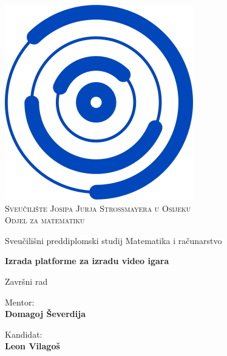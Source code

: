 \documentclass{mathos}
\begin{document}
\renewcommand\bibname{Literatura}
\renewcommand\labelitemi{-}

\begin{titlepage}
    \begin{center}
        \includegraphics[keepaspectratio=true,scale=0.4]{MathosLogo.png} \\ \vspace{1mm}
        \textsc{Sveučilište Josipa Jurja Strossmayera u Osijeku} \\
        \vspace{2mm}
        \textsc{Odjel za matematiku}
    \end{center}

    \begin{center}
        \vspace{4mm}
        {Sveučilišni preddiplomski studij Matematika i računarstvo}
    \end{center}

    \vspace{25mm}
    \begin{center}
        {\LARGE{\bf  Izrada platforme za izradu video igara}}

        \vspace{15mm}
        {\large{\sc Završni rad}}


    \end{center}

    \vspace{50mm}

    \begin{minipage}[t]{0.47\textwidth}
        {Mentor:} \normalsize\vspace{3mm}
        {\bf\\ \large{Domagoj Ševerdija}}
    \end{minipage}
    \hfill
    \begin{minipage}[t]{0.47\textwidth}\raggedleft
        {{Kandidat:}{\normalsize\vspace{3mm} \bf\\ \large{Leon Vilagoš}}}
    \end{minipage}

    \vspace*{\fill}
\end{titlepage}
\end{document}
